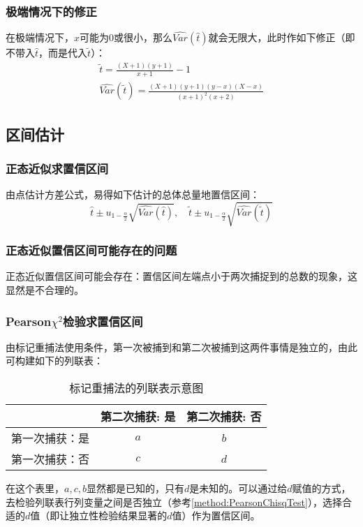 \subsubsection{极端情况下的修正}
在极端情况下，$x$可能为$0$或很小，那么$\widehat{Var}(\hat{t})$就会无限大，此时作如下修正（即不带入$\hat{t}$，而是代入$\tilde{t}$）：
\begin{gather*}
	\tilde{t}=\frac{(X+1)(y+1)}{x+1}-1 \\
	\widehat{Var}(\tilde{t})=\frac{(X+1)(y+1)(y-x)(X-x)}{(x+1)^2(x+2)}
\end{gather*}

\subsection{区间估计}
\subsubsection{正态近似求置信区间}
由点估计方差公式，易得如下估计的总体总量地置信区间：
\begin{equation*}
	\hat{t}\pm u_{1-\frac{\alpha}{2}}\sqrt{\widehat{Var}(\hat{t})},\quad
	\tilde{t}\pm u_{1-\frac{\alpha}{2}}\sqrt{\widehat{Var}(\tilde{t})}
\end{equation*}
\subsubsection{正态近似置信区间可能存在的问题}
正态近似置信区间可能会存在：置信区间左端点小于两次捕捉到的总数的现象，这显然是不合理的。
\subsubsection{Pearson$\chi^2$检验求置信区间}
由标记重捕法使用条件，第一次被捕到和第二次被捕到这两件事情是独立的，由此可构建如下的列联表：
\begin{table}[h!]
	\centering
	\begin{tabular}{@{}lcc@{}}
		\toprule
		& 第二次捕获: 是 & 第二次捕获: 否 \\ 
		\midrule
		第一次捕获：是    & $a$           & $b$           \\
		第一次捕获：否    & $c$           & $d$           \\ 
		\bottomrule
	\end{tabular}
	\caption{标记重捕法的列联表示意图}
\end{table}\par 
在这个表里，$a,c,b$显然都是已知的，只有$d$是未知的。可以通过给$d$赋值的方式，去检验列联表行列变量之间是否独立（参考\ref{method:PearsonChisqTest}），选择合适的$d$值（即让独立性检验结果显著的$d$值）作为置信区间。
